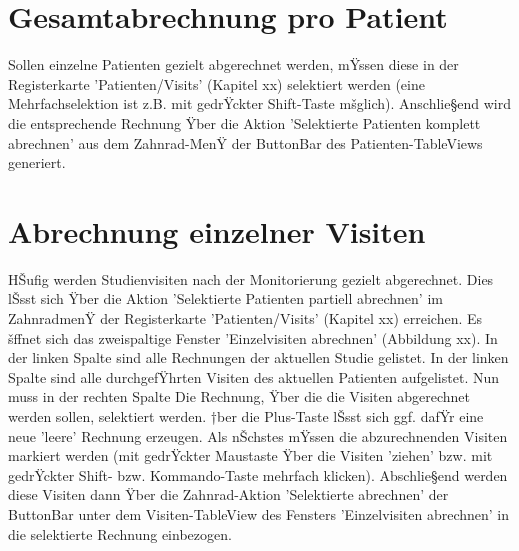 \documentclass[11pt,oneside]{scrbook}
\begin{document}
\section{Gesamtabrechnung pro Patient}
Sollen einzelne Patienten gezielt abgerechnet werden, mŸssen diese in der Registerkarte 'Patienten/Visits' (Kapitel xx) selektiert werden (eine Mehrfachselektion ist z.B. mit gedrŸckter Shift-Taste mšglich). Anschlie§end wird die entsprechende Rechnung Ÿber die Aktion 'Selektierte Patienten komplett abrechnen' aus dem  Zahnrad-MenŸ der ButtonBar des Patienten-TableViews generiert.

\section{Abrechnung einzelner Visiten}
HŠufig werden Studienvisiten nach der Monitorierung gezielt abgerechnet. Dies lŠsst sich Ÿber die Aktion 'Selektierte Patienten partiell abrechnen' im ZahnradmenŸ der Registerkarte 'Patienten/Visits' (Kapitel xx) erreichen. Es šffnet sich das zweispaltige Fenster 'Einzelvisiten abrechnen' (Abbildung xx). In der linken Spalte sind alle Rechnungen der aktuellen Studie gelistet.  In der linken Spalte sind alle durchgefŸhrten Visiten des aktuellen Patienten aufgelistet. Nun muss in der rechten Spalte Die Rechnung, Ÿber die die Visiten abgerechnet werden sollen, selektiert werden.  †ber die Plus-Taste lŠsst sich ggf. dafŸr eine neue 'leere' Rechnung erzeugen. Als nŠchstes mŸssen die abzurechnenden Visiten markiert werden (mit gedrŸckter Maustaste Ÿber die Visiten 'ziehen' bzw. mit gedrŸckter Shift- bzw. Kommando-Taste mehrfach klicken). Abschlie§end werden diese Visiten dann Ÿber die Zahnrad-Aktion 'Selektierte abrechnen' der ButtonBar unter dem Visiten-TableView des Fensters 'Einzelvisiten abrechnen' in die selektierte Rechnung einbezogen.
\end{document}
